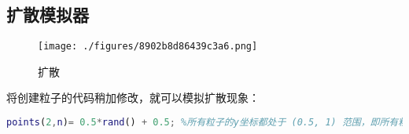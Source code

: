 \subsection{扩散模拟器}
\begin{figure}[ht]
\centering
\texttt{[image: ./figures/8902b8d86439c3a6.png]}
\caption{扩散} \label{fig_DIFMIX_fig2}
\end{figure}
将创建粒子的代码稍加修改，就可以模拟扩散现象：
\begin{lstlisting}[language=matlab]
points(2,n)= 0.5*rand() + 0.5; %所有粒子的y坐标都处于 (0.5, 1) 范围，即所有粒子初始时仅分布在上半容器。
\end{lstlisting}

